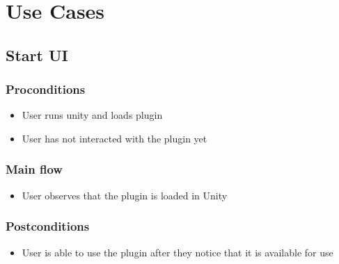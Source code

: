 \section{Use Cases}
\subsection{Start UI}
    \subsubsection{Proconditions}
    \begin{itemize}
        \item User runs unity and loads plugin
        \item User has not interacted with the plugin yet
    \end{itemize}
    \subsubsection{Main flow}
    \begin{itemize}
        \item User observes that the plugin is loaded in Unity
    \end{itemize}
    \subsubsection{Postconditions}
    \begin{itemize}
        \item User is able to use the plugin after they notice that it is available for use
    \end{itemize}
